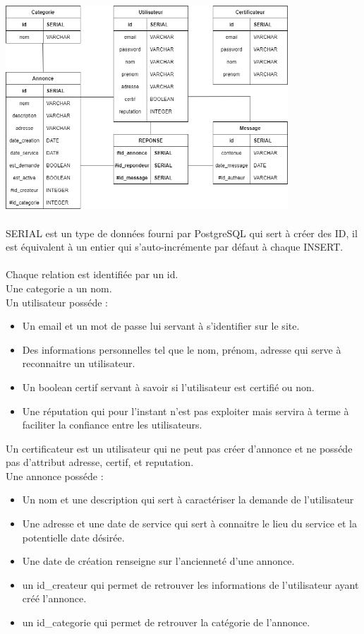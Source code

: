 \documentclass[a4paper,11pt]{article}
\begin{document}
\includegraphics[width=400px]{../Conception/BDD/Schema-relationnel-BDD.png}\\\\
SERIAL est un type de données fourni par PostgreSQL qui sert à créer des ID, il est équivalent à un entier qui s'auto-incrémente par défaut à chaque INSERT.\\\\

Chaque relation est identifiée par un id.\\
Une categorie a un nom.\\
Un utilisateur posséde :
\begin{itemize}
    \item Un email et un mot de passe lui servant à s'identifier sur le site.
    \item Des informations personnelles tel que le nom, prénom, adresse qui serve à reconnaitre un utilisateur.
    \item Un boolean certif servant à savoir si l'utilisateur est certifié ou non.
    \item Une réputation qui pour l'instant n'est pas exploiter mais servira à terme à faciliter la confiance entre les utilisateurs.
\end{itemize}

Un certificateur est un utilisateur qui ne peut pas créer d'annonce et ne posséde pas d'attribut adresse, certif, et reputation.\\
Une annonce posséde :
\begin{itemize}
    \item Un nom et une description qui sert à caractériser la demande de l'utilisateur
    \item Une adresse et une date de service qui sert à connaitre le lieu du service et la potentielle date désirée.
    \item Une date de création renseigne sur l'ancienneté d'une annonce.
    \item un id\_createur qui permet de retrouver les informations de l'utilisateur ayant créé l'annonce.
    \item un id\_categorie qui permet de retrouver la catégorie de l'annonce.
\end{itemize}
\end{document}
